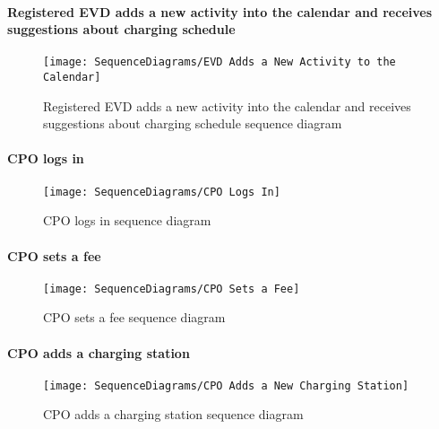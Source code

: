 \paragraph{Registered EVD adds a new activity into the calendar and receives suggestions about charging schedule}
\begin{figure}[H]
    \begin{center}
        \texttt{[image: SequenceDiagrams/EVD Adds a New Activity to the Calendar]}
        \caption{Registered EVD adds a new activity into the calendar and receives suggestions about charging schedule sequence diagram}
        \label{Registered EVD adds a new activity into the calendar and receives suggestions about charging schedule sequence diagram}
    \end{center}
\end{figure}

\paragraph{CPO logs in}
\begin{figure}[H]
    \begin{center}
        \texttt{[image: SequenceDiagrams/CPO Logs In]}
        \caption{CPO logs in sequence diagram}
        \label{cpo_logs_in}
    \end{center}
\end{figure}

\paragraph{CPO sets a fee}
\begin{figure}[H]
    \begin{center}
        \texttt{[image: SequenceDiagrams/CPO Sets a Fee]}
        \caption{CPO sets a fee sequence diagram}
        \label{cpo_sets_fee}
    \end{center}
\end{figure}

\paragraph{CPO adds a charging station}
\begin{figure}[H]
    \begin{center}
        \texttt{[image: SequenceDiagrams/CPO Adds a New Charging Station]}
        \caption{CPO adds a charging station sequence diagram}
        \label{cpo_adds_new_charging_station}
    \end{center}
\end{figure}

